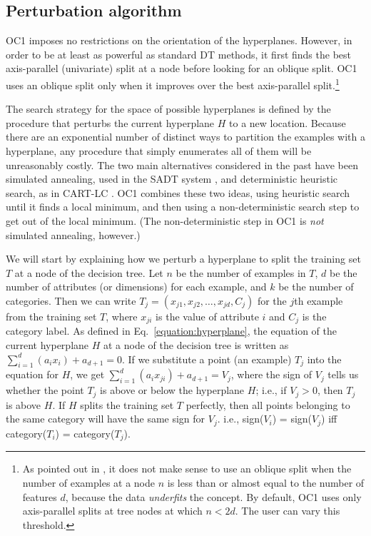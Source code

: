 \subsection{Perturbation algorithm}
\label{section:perturb}
OC1 imposes no restrictions on the orientation of the hyperplanes.
However, in order to be at least as powerful as standard DT methods,
it first finds the best axis-parallel (univariate) split at a node
before looking for an oblique split.  OC1 uses an oblique split only
when it improves over the best axis-parallel split.\footnote{As
pointed out in \cite[Chapter 5]{breiman/etal/84}, it does not make
sense to use an oblique split when the number of examples at a node
$n$ is less than or almost equal to the number of features $d$,
because the data {\it underfits} the concept. By default, OC1 uses
only axis-parallel splits at tree nodes at which $n < 2d$. The user
can vary this threshold.}

The search strategy for the space of possible hyperplanes is defined
by the procedure that perturbs the current hyperplane $H$ to a new
location.  Because there are an exponential number of distinct ways to
partition the examples with a hyperplane, any procedure that simply
enumerates all of them will be unreasonably costly.  The two main
alternatives considered in the past have been simulated annealing,
used in the SADT system \cite{heath/etal/93}, and deterministic
heuristic search, as in CART-LC \cite{breiman/etal/84}.  OC1 combines
these two ideas, using heuristic search until it finds a local
minimum, and then using a non-deterministic search step to get out of
the local minimum.  (The non-deterministic step in OC1 is {\it not}
simulated annealing, however.)

We will start by explaining how we perturb a hyperplane to split the
training set $T$ at a node of the decision tree.  Let $n$ be the
number of examples in $T$, $d$ be the number of attributes (or
dimensions) for each example, and $k$ be the number of categories.
Then we can write $T_j = (x_{j1},x_{j2},\ldots,x_{jd},C_j)$ for the
$j$th example from the training set $T$, where $x_{ji}$ is the value
of attribute $i$ and $C_j$ is the category label.  As defined
in Eq.~\ref{equation:hyperplane}, the 
equation of the current hyperplane $H$ at a node of the decision tree
is written as \( \sum_{i=1}^{d} (a_i x_i) + a_{d+1} = 0 \). 
If we substitute a point (an example) $T_j$ into the equation for $H$,
we get \( \sum_{i=1}^{d} (a_i x_{ji}) + a_{d+1}  = V_j\),
where the sign of $V_j$ tells us whether the point $T_j$ is above or
below the hyperplane $H$; i.e., if $V_j > 0$, then $T_j$ is above $H$.
If $H$ splits the training set $T$ perfectly, then all points
belonging to the same category will have the same sign for
$V_j$. i.e., sign($V_i$) = sign($V_j$) iff category($T_i$) =
category($T_j$).

